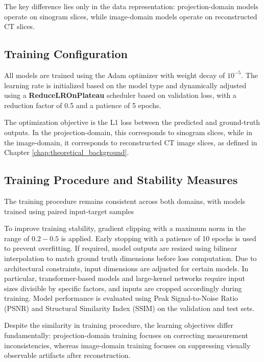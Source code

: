 The key difference lies only in the data representation: projection-domain models operate on sinogram slices, while image-domain models operate on reconstructed CT slices. 


\subsection{Training Configuration}


All models are trained using the Adam optimizer with weight decay of $ 10^{-5}$. The learning rate is initialized based on the model type and dynamically adjusted using a \textbf{ReduceLROnPlateau } scheduler based on validation loss, with a reduction factor of 0.5 and a patience of 5 epochs.

The optimization objective is the L1 loss between the predicted and ground-truth outputs. In the projection-domain, this corresponds to sinogram slices, while in the image-domain, it corresponds to reconstructed CT image slices, as defined in Chapter \ref{chap:theoretical_background}. 




\subsection{Training Procedure and Stability Measures}
The training procedure remains consistent across both domains, with models trained using paired input-target samples 

To improve training stability, gradient clipping with a maximum norm in the range of $0.2 - 0.5$ is applied. Early stopping with a patience of 10 epochs is used to prevent overfitting. If required, model outputs are resized using bilinear interpolation to match ground truth dimensions before loss computation. 
Due to architectural constraints, input dimensions are adjusted for certain models. In particular, transformer-based models and large-kernel networks require input sizes divisible by specific factors, and inputs are cropped accordingly during training. Model performance is evaluated using Peak Signal-to-Noise Ratio (PSNR) and Structural Similarity Index (SSIM) on the validation and test sets. 

Despite the similarity in training procedure, the learning objectives differ fundamentally: projection-domain training focuses on correcting measurement inconsistencies, whereas image-domain training focuses on suppressing visually observable artifacts after reconstruction. 

